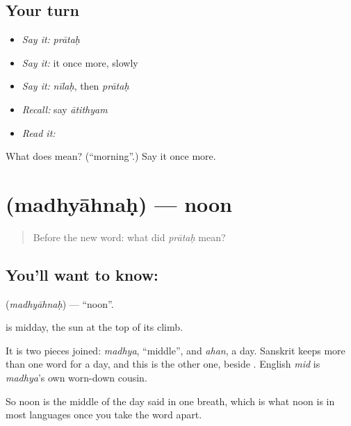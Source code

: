 \subsection*{Your turn}
\begin{itemize}
\raggedright
  \item \emph{Say it:} \emph{prātaḥ}
  \item \emph{Say it:} it once more, slowly
  \item \emph{Say it:} \emph{nīlaḥ}, then \emph{prātaḥ}
  \item \emph{Recall:} say \emph{ātithyam}
  \item \emph{Read it:} \textbf{}
\end{itemize}

\begin{tcolorbox}[breakable,colback=teal!4,colframe=teal!35!black,title={Before you move on}]
What does  mean? (\textquotedblleft{}morning\textquotedblright{}.) Say it once more.
\end{tcolorbox}
\section[\texorpdfstring{\sk{मध्याह्नः} (madhyāhnaḥ)}{मध्याह्नः (madhyāhnaḥ)}]{ (madhyāhnaḥ) — noon}

\label{lesson:SA-C45-noon}



\begin{quote}
Before the new word: what did \emph{prātaḥ} mean?
\end{quote}

\subsection*{You'll want to know: }
\textbf{} (\emph{madhyāhnaḥ}) — \textquotedblleft{}noon\textquotedblright{}.

\textbf{} is midday, the sun at the top of its climb.

It is two pieces joined: \emph{madhya}, \textquotedblleft{}middle\textquotedblright{}, and \emph{ahan}, a day. Sanskrit keeps more than one word for a day, and this is the other one, beside . English \emph{mid} is \emph{madhya}'s own worn-down cousin.

So noon is the middle of the day said in one breath, which is what noon is in most languages once you take the word apart.

